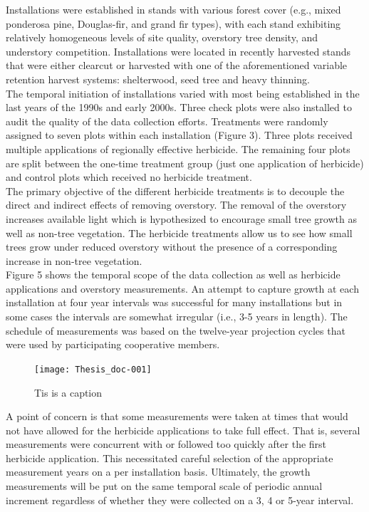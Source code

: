 \documentclass[10pt, letterpaper, fleqn]{article}
\begin{document}
Installations were established in stands with various forest cover (e.g., mixed ponderosa pine, Douglas-fir, and grand fir types), with each stand exhibiting relatively homogeneous levels of site quality, overstory tree density, and understory competition.  Installations were located in recently harvested stands that were either clearcut or harvested with one of the aforementioned variable retention harvest systems: shelterwood, seed tree and heavy thinning. \\[2pt]

The temporal initiation of installations varied with most being established in the last years of the 1990s and early 2000s.  Three check plots were also installed to audit the quality of the data collection efforts. Treatments were randomly assigned to seven plots within each installation (Figure 3).  Three plots received multiple applications of regionally effective herbicide.  The remaining four plots are split between the one-time treatment group (just one application of herbicide) and control plots which received no herbicide treatment.\\[2pt]
\noindent 
The primary objective of the different herbicide treatments is to decouple the direct and indirect effects of removing overstory. The removal of the overstory increases available light which is hypothesized to encourage small tree growth as well as non-tree vegetation.  The herbicide treatments allow us to see how small trees grow under reduced overstory without the presence of a corresponding increase in non-tree vegetation.\\[2pt]
\noindent 
Figure 5 shows the temporal scope of the data collection as well as herbicide applications and overstory measurements. An attempt to capture growth at each installation at four year intervals was successful for many installations but in some cases the intervals are somewhat irregular (i.e., 3-5 years in length). The schedule of measurements was based on the twelve-year projection cycles that were used by participating cooperative members.\\[2pt]
\begin{figure}
\begin{center}
\texttt{[image: Thesis\_doc-001]}
\caption{Tis is a caption}
\end{center}
\end{figure}
\noindent 
A point of concern is that some measurements were taken at times that would not have allowed for the herbicide applications to take full effect. That is, several measurements were concurrent with or followed too quickly after the first herbicide application.  This necessitated careful selection of the appropriate measurement years on a per installation basis.  Ultimately, the growth measurements will be put on the same temporal scale of periodic annual increment regardless of whether they were collected on a 3, 4 or 5-year interval. \\[2pt]
\end{document}
